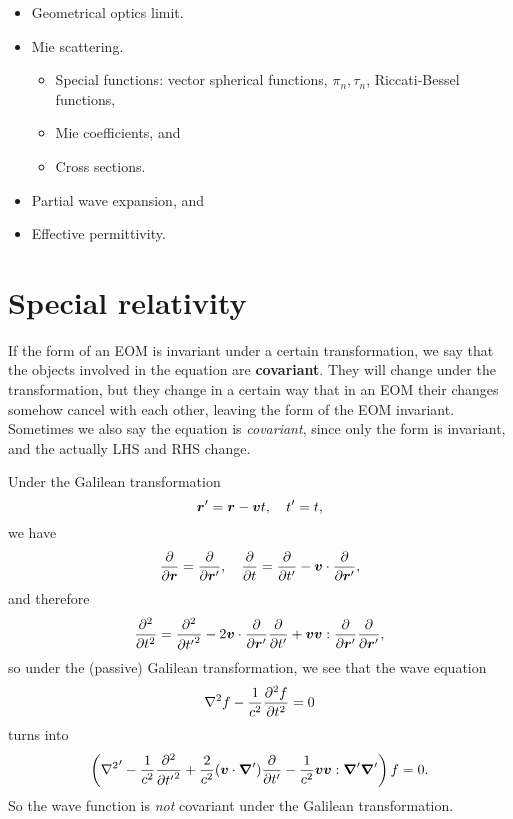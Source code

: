 \documentclass[hyperref, a4paper]{article}
\newcommand*{\concept}[1]{{\textbf{#1}}}
\begin{document}
\begin{itemize}
    \item Geometrical optics limit.
    \item Mie scattering.
    \begin{itemize}
        \item Special functions: vector spherical functions, $\pi_n, \tau_n$, Riccati-Bessel functions,
        \item Mie coefficients, and
        \item Cross sections.        
    \end{itemize}
    \item Partial wave expansion, and
    \item Effective permittivity.
\end{itemize}

\section{Special relativity}

If the form of an EOM is invariant under a certain transformation, we say that the objects involved 
in the equation are \concept{covariant}. They will change under the transformation, but they change 
in a certain way that in an EOM their changes somehow cancel with each other, leaving the form of the 
EOM invariant. Sometimes we also say the equation is \emph{covariant}, since only the form is invariant,
and the actually LHS and RHS change.

Under the Galilean transformation
\begin{equation}
    \vb*{r}' = \vb*{r} - \vb*{v} t, \quad t' = t,
\end{equation}
we have 
\begin{equation}
    \pdv{\vb*{r}} = \pdv{\vb*{r}'}, \quad \pdv{t} = \pdv{t'} - \vb*{v} \cdot \pdv{\vb*{r}'},
\end{equation}
and therefore 
\begin{equation}
    \pdv[2]{t} = \pdv[2]{{t'}} - 2 \vb*{v} \cdot \pdv{\vb*{r}'} \pdv{t'} + \vb*{v} \vb*{v} : \pdv{\vb*{r}'} \pdv{\vb*{r}'},
\end{equation}
so under the (passive) Galilean transformation, we see that the wave equation 
\begin{equation}
    \laplacian f - \frac{1}{c^2} \pdv[2]{f}{t} = 0
\end{equation}
turns into 
\begin{equation}
    \left( {\laplacian}' - \frac{1}{c^2} \pdv[2]{{t'}} + \frac{2}{c^2} (\vb*{v} \cdot \grad') \pdv{t'} - \frac{1}{c^2} \vb*{v} \vb*{v} : \grad' \grad' \right) f = 0.
\end{equation}
So the wave function is \emph{not} covariant under the Galilean transformation.
\end{document}
